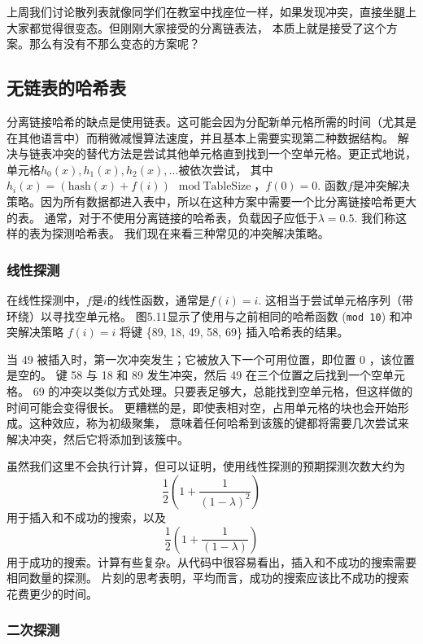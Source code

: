 \documentclass[a4paper]{ctexart}
\theoremstyle{definition}
\theoremstyle{definition}
\begin{document}
上周我们讨论散列表就像同学们在教室中找座位一样，如果发现冲突，直接坐腿上大家都觉得很变态。但刚刚大家接受的分离链表法，
本质上就是接受了这个方案。那么有没有不那么变态的方案呢？

\subsection{无链表的哈希表}

分离链接哈希的缺点是使用链表。这可能会因为分配新单元格所需的时间（尤其是在其他语言中）而稍微减慢算法速度，并且基本上需要实现第二种数据结构。
解决与链表冲突的替代方法是尝试其他单元格直到找到一个空单元格。更正式地说，单元格$h_0(x), h_1(x), h_2(x), \ldots$被依次尝试，
其中$h_i(x) = (\text{hash}(x) + f(i)) \mod \text{TableSize}$，$f(0) = 0$. 
函数$f$是冲突解决策略。因为所有数据都进入表中，所以在这种方案中需要一个比分离链接哈希更大的表。
通常，对于不使用分离链接的哈希表，负载因子应低于$\lambda = 0.5$. 我们称这样的表为探测哈希表。
我们现在来看三种常见的冲突解决策略。

\subsubsection{线性探测}

在线性探测中，$f$是$i$的线性函数，通常是$f(i) = i$. 这相当于尝试单元格序列（带环绕）以寻找空单元格。
图5.11显示了使用与之前相同的哈希函数 (\verb|mod 10|) 和冲突解决策略 $f(i) = i$ 将键 \{89, 18, 49, 58, 69\} 插入哈希表的结果。

当 49 被插入时，第一次冲突发生；它被放入下一个可用位置，即位置 0 ，该位置是空的。
键 58 与 18 和 89 发生冲突，然后 49 在三个位置之后找到一个空单元格。
69 的冲突以类似方式处理。只要表足够大，总能找到空单元格，但这样做的时间可能会变得很长。
更糟糕的是，即使表相对空，占用单元格的块也会开始形成。这种效应，称为初级聚集，
意味着任何哈希到该簇的键都将需要几次尝试来解决冲突，然后它将添加到该簇中。

虽然我们这里不会执行计算，但可以证明，使用线性探测的预期探测次数大约为 
$$
\frac{1}{2}(1 + \frac{1}{(1 - \lambda)^2})
$$
用于插入和不成功的搜索，以及
$$
\frac{1}{2}(1 + \frac{1}{(1 - \lambda)})
$$
用于成功的搜索。计算有些复杂。从代码中很容易看出，插入和不成功的搜索需要相同数量的探测。
片刻的思考表明，平均而言，成功的搜索应该比不成功的搜索花费更少的时间。

\subsubsection{二次探测}
\end{document}
